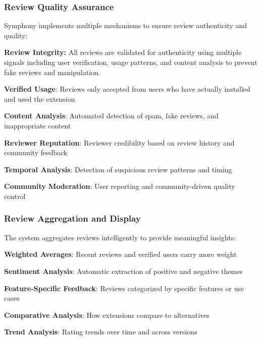 \subsubsection{Review Quality Assurance}
\label{subsubsec:review-quality-assurance}

Symphony implements multiple mechanisms to ensure review authenticity and quality:

\begin{alertbox}
\textbf{Review Integrity:} All reviews are validated for authenticity using multiple signals including user verification, usage patterns, and content analysis to prevent fake reviews and manipulation.
\end{alertbox}

\begin{expandedlist}
\item \textbf{Verified Usage}: Reviews only accepted from users who have actually installed and used the extension
\item \textbf{Content Analysis}: Automated detection of spam, fake reviews, and inappropriate content
\item \textbf{Reviewer Reputation}: Reviewer credibility based on review history and community feedback
\item \textbf{Temporal Analysis}: Detection of suspicious review patterns and timing
\item \textbf{Community Moderation}: User reporting and community-driven quality control
\end{expandedlist}

\subsubsection{Review Aggregation and Display}
\label{subsubsec:review-aggregation-display}

The system aggregates reviews intelligently to provide meaningful insights:

\begin{compactlist}
\item \textbf{Weighted Averages}: Recent reviews and verified users carry more weight
\item \textbf{Sentiment Analysis}: Automatic extraction of positive and negative themes
\item \textbf{Feature-Specific Feedback}: Reviews categorized by specific features or use cases
\item \textbf{Comparative Analysis}: How extensions compare to alternatives
\item \textbf{Trend Analysis}: Rating trends over time and across versions
\end{compactlist}

